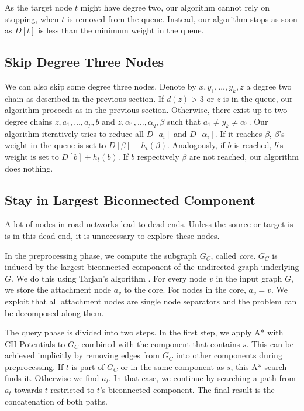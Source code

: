 \documentclass[a4paper,USenglish,cleveref, autoref, thm-restate]{lipics-v2019}
\begin{document}
As the target node $t$ might have degree two, our algorithm cannot rely on stopping, when $t$ is removed from the queue.
Instead, our algorithm stops as soon as $D[t]$ is less than the minimum weight in the queue.

\subsection{Skip Degree Three Nodes}

We can also skip some degree three nodes.
Denote by $x,y_1,\ldots, y_k, z$ a degree two chain as described in the previous section.
If $d(z) > 3$ or $z$ is in the queue, our algorithm proceeds as in the previous section.
Otherwise, there exist up to two degree chains $z,a_1,\ldots,a_p,b$ and $z,\alpha_1,\ldots,\alpha_q,\beta$ such that $a_1\neq y_k \neq \alpha_1$.
Our algorithm iteratively tries to reduce all $D[a_i]$ and $D[\alpha_i]$.
If it reaches $\beta$, $\beta$'s weight in the queue is set to $D[\beta]+h_t(\beta)$.
Analogously, if $b$ is reached, $b$'s weight is set to $D[b]+h_t(b)$.
If $b$ respectively $\beta$ are not reached, our algorithm does nothing.

\subsection{Stay in Largest Biconnected Component}
\label{sec:largested-biconnected-component}

A lot of nodes in road networks lead to dead-ends.
Unless the source or target is is in this dead-end, it is unnecessary to explore these nodes.

In the preprocessing phase, we compute the subgraph $G_C$, called \emph{core}.
$G_C$ is induced by the largest biconnected component of the undirected graph underlying $G$.
We do this using Tarjan's algorithm \cite{t-dfslg2-72}.
For every node $v$ in the input graph $G$, we store the attachment node $a_v$ to the core.
For nodes in the core, $a_v=v$.
We exploit that all attachment nodes are single node separators and the problem can be decomposed along them.

The query phase is divided into two steps.
In the first step, we apply A* with CH-Potentials to $G_C$ combined with the component that contains $s$.
This can be achieved implicitly by removing edges from $G_C$ into other components during preprocessing.
If $t$ is part of $G_C$ or in the same component as $s$, this A* search finds it.
Otherwise we find $a_t$.
In that case, we continue by searching a path from $a_t$ towards $t$ restricted to $t$'s biconnected component.
The final result is the concatenation of both paths.
\end{document}
